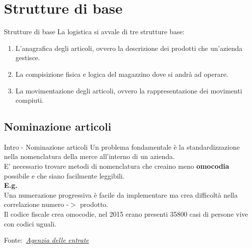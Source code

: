 \documentclass{beamer}
\newcommand{\credit}[1]{\par\hfill \footnotesize Fonte:~\itshape#1}
\begin{document}
    \section{Strutture di base}
    \begin{frame}{Strutture di base}
        La logistica si avvale di tre strutture base:
        \begin{enumerate}
            \item L'anagrafica degli articoli, ovvero la descrizione dei prodotti che un'azienda gestisce.
            \item La compisizione fisica e logica del magazzino dove si andrà ad operare.
            \item La movimentazione degli articoli, ovvero la rappresentazione dei movimenti compiuti.
        \end{enumerate}
    \end{frame}

    \subsection{Nominazione articoli}
    \begin{frame}{Intro -  Nominazione articoli}
        Un problema fondamentale è la standardizzazione nella nomenclatura della merce all'interno di un azienda.\\
        E' necessario trovare metodi di nomenclatura che creaino meno \textbf{omocodia} possibile e che siano facilmente leggibili.\\
        \vspace{1.5em}
        \textbf{E.g.}\\
        Una numerazione progressiva è facile da implementare ma crea difficoltà nella correlazione numero -$>$ prodotto.\\
        Il codice fiscale crea omocodie, nel 2015 erano presenti 35800 casi di persone vive con codici uguali.
        \credit{\href{https://www.agenziaentrate.gov.it/portale/documents/20143/318757/Audizione+del+Direttore+dell+Agenzia+delle+Entrate+10+02+2016_Audizione+-+Codice+Fiscale+e+Omocodie+-+10+feb+2016+df.pdf/202e5395-f622-62e5-219a-7ce894d538a4}{Agenzia delle entrate}} 
    \end{frame}
\end{document}
